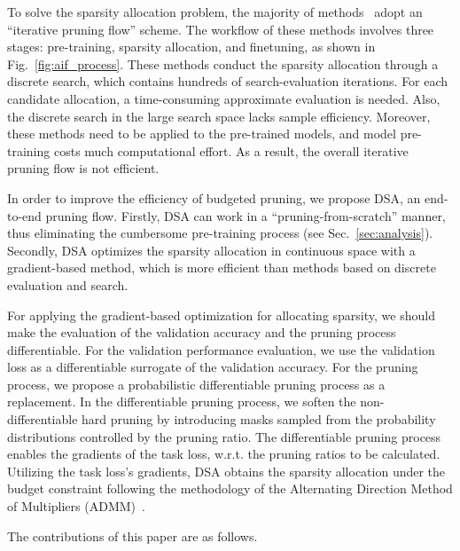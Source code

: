 \documentclass[runningheads]{llncs}
\newcommand{\dsa}{DSA\xspace}
\begin{document}
  To solve the sparsity allocation problem, the majority of methods~\cite{netadapt,amc,autocompress,liu2019metapruning} adopt an ``iterative pruning flow'' scheme. The workflow of these methods involves three stages: pre-training, sparsity allocation, and finetuning, as shown in Fig.~\ref{fig:aif_process}. These methods conduct the sparsity allocation through a discrete search, which contains hundreds of search-evaluation iterations. For each candidate allocation, a time-consuming approximate evaluation is needed. Also, the discrete search in the large search space lacks sample efficiency. Moreover, these methods need to be applied to the pre-trained models, and model pre-training costs much computational effort. As a result, the overall iterative pruning flow is not efficient.
  
  
  In order to improve the efficiency of budgeted pruning, we propose \dsa, an end-to-end pruning flow. 
  Firstly, DSA can work in a ``pruning-from-scratch'' manner, thus eliminating the cumbersome pre-training process (see Sec.~\ref{sec:analysis}). Secondly, \dsa optimizes the sparsity allocation in continuous space with a gradient-based method, which is more efficient than methods based on discrete evaluation and search. 
  
  For applying the gradient-based optimization for allocating sparsity, we should make the evaluation of the validation accuracy and the pruning process differentiable. 
  For the validation performance evaluation, we use the validation loss as a differentiable surrogate of the validation accuracy.
  For the pruning process, we propose a probabilistic differentiable pruning process as a replacement. In the differentiable pruning process, we soften the non-differentiable hard pruning by introducing masks sampled from the probability distributions controlled by the pruning ratio. The differentiable pruning process enables the gradients of the task loss, w.r.t. the pruning ratios to be calculated.
  Utilizing the task loss's gradients, \dsa obtains the sparsity allocation under the budget constraint following the methodology of the Alternating Direction Method of Multipliers (ADMM)~\cite{admm}.
  
  The contributions of this paper are as follows.
  
\end{document}
